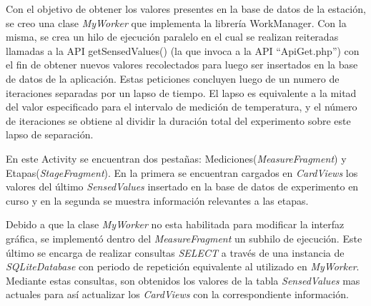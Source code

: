              \par Con el objetivo de obtener los valores presentes en la base de datos de la estación, se creo una clase \textit{MyWorker} que implementa la librería WorkManager. Con la misma, se crea un hilo de ejecución paralelo en el cual se realizan reiteradas llamadas a la API getSensedValues() (la que invoca a la API ``ApiGet.php'') con el fin de obtener nuevos valores recolectados para luego ser insertados en la base de datos de la aplicación. Estas peticiones concluyen luego de un numero de iteraciones separadas por un lapso de tiempo. El lapso es equivalente a la mitad del valor especificado para el intervalo de medición de temperatura, y el número de iteraciones se obtiene al dividir la duración total del experimento sobre este lapso de separación.
             
            \par En este Activity se encuentran dos pestañas: Mediciones(\textit{MeasureFragment}) y Etapas(\textit{StageFragment}). En la primera se encuentran cargados en \textit{CardViews} los valores del último \textit{SensedValues} insertado en la base de datos de experimento en curso y en la segunda se muestra información relevantes a las etapas.
            
            \par Debido a que la clase \textit{MyWorker} no esta habilitada para modificar la interfaz gráfica, se implementó dentro del \textit{MeasureFragment} un subhilo de ejecución. Este último se encarga de realizar consultas \textit{SELECT} a través de una instancia de \textit{SQLiteDatabase} con periodo de repetición equivalente al utilizado en \textit{MyWorker}. Mediante estas consultas, son obtenidos  los valores de la tabla \textit{SensedValues} mas actuales para así actualizar los \textit{CardViews} con la correspondiente información.
            
